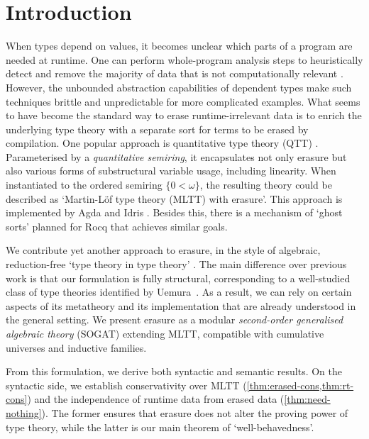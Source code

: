 \documentclass[10pt,a4paper]{article}
\theoremstyle{definition}
\theoremstyle{remark}
\begin{document}
\section{Introduction}\label{sec:intro}

When types depend on values, it becomes unclear which parts of a program are
needed at runtime. One can perform whole-program analysis steps to heuristically
detect and remove the majority of data that is not computationally relevant
\cite{Brady2004-ay,Tejiscak2020-rg}. However, the unbounded abstraction
capabilities of dependent types make such techniques brittle and unpredictable
for more complicated examples. What seems to have become the standard way to
erase runtime-irrelevant data is to enrich the underlying type theory with a
separate sort for terms to be erased by compilation. One popular approach
is quantitative type theory (QTT) \cite{McBride2016-oa,Atkey2018-pj}. Parameterised by a
\emph{quantitative semiring}, it encapsulates not only erasure but also
various forms of substructural variable usage, including linearity. When
instantiated to the ordered semiring $\{0 < \omega\}$, the resulting theory
could be described as `Martin-L\"of type theory (MLTT) with erasure'. This approach is
implemented by Agda \cite{agda-irrelevance} and Idris \cite{idris-quantities}.
Besides this, there is a mechanism of `ghost sorts' \cite{Winterhalter2024-pw}
planned for Rocq \cite{Winterhalter2025-tt} that achieves
similar goals.


We contribute yet another approach to erasure, in the style of algebraic,
reduction-free `type theory in type theory' \cite{Altenkirch2016-zc}. The main
difference over previous work is that our formulation is fully structural,
corresponding to a well-studied class of type theories identified by
Uemura~\cite{Uemura2021-jq}. As a result, we can rely on certain aspects of its
metatheory and its implementation that are already understood in the general
setting. We present erasure as a modular \emph{second-order generalised
algebraic theory} (SOGAT) extending MLTT, compatible with cumulative universes
and inductive families.

From this formulation, we derive both syntactic and semantic results. On the
syntactic side, we establish conservativity over MLTT
(\cref{thm:erased-cons,thm:rt-cons}) and the independence of runtime data from
erased data (\cref{thm:need-nothing}). The former ensures that erasure does not
alter the proving power of type theory, while the latter is our main theorem of
`well-behavedness'.
\end{document}
